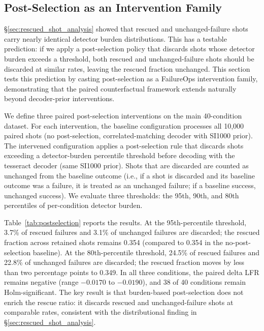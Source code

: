 \subsection{Post-Selection as an Intervention Family}
\label{sec:postselection}

\S\ref{sec:rescued_shot_analysis} showed that rescued and unchanged-failure shots carry nearly identical detector burden distributions. This has a testable prediction: if we apply a post-selection policy that discards shots whose detector burden exceeds a threshold, both rescued and unchanged-failure shots should be discarded at similar rates, leaving the rescued fraction unchanged. This section tests this prediction by casting post-selection as a FailureOps intervention family, demonstrating that the paired counterfactual framework extends naturally beyond decoder-prior interventions.

We define three paired post-selection interventions on the main 40-condition dataset. For each intervention, the baseline configuration processes all 10,000 paired shots (no post-selection, correlated-matching decoder with SI1000 prior). The intervened configuration applies a post-selection rule that discards shots exceeding a detector-burden percentile threshold before decoding with the tesseract decoder (same SI1000 prior). Shots that are discarded are counted as unchanged from the baseline outcome (i.e., if a shot is discarded and its baseline outcome was a failure, it is treated as an unchanged failure; if a baseline success, unchanged success). We evaluate three thresholds: the 95th, 90th, and 80th percentiles of per-condition detector burden.

Table~\ref{tab:postselection} reports the results. At the 95th-percentile threshold, 3.7\% of rescued failures and 3.1\% of unchanged failures are discarded; the rescued fraction across retained shots remains 0.354 (compared to 0.354 in the no-post-selection baseline). At the 80th-percentile threshold, 24.5\% of rescued failures and 22.8\% of unchanged failures are discarded; the rescued fraction moves by less than two percentage points to 0.349. In all three conditions, the paired delta LFR remains negative (range $-0.0170$ to $-0.0190$), and 38 of 40 conditions remain Holm-significant. The key result is that burden-based post-selection does not enrich the rescue ratio: it discards rescued and unchanged-failure shots at comparable rates, consistent with the distributional finding in \S\ref{sec:rescued_shot_analysis}.

